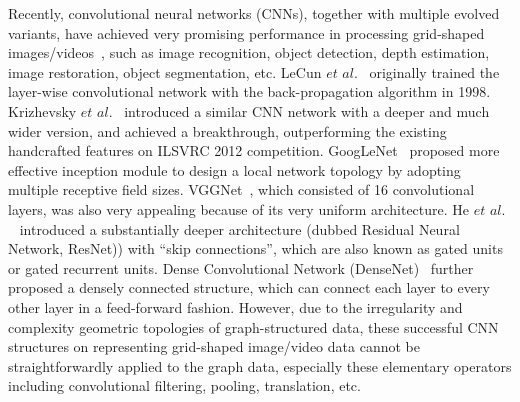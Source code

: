 \documentclass[journal]{IEEEtran}
\begin{document}
Recently, convolutional neural networks (CNNs), together with multiple evolved variants, have achieved very promising performance in processing grid-shaped images/videos~\cite{alexnet,vgg,densenet,resnet}, such as image recognition, object detection, depth estimation, image restoration, object segmentation, etc.
LeCun $\textit{et al.}$~\cite{Lecun98} originally trained the layer-wise convolutional network with the back-propagation algorithm in 1998.
Krizhevsky $\textit{et al.}$~\cite{alexnet} introduced a similar CNN network with a deeper and much wider version, and achieved a breakthrough, outperforming the existing handcrafted features on ILSVRC 2012 competition.
GoogLeNet~\cite{googleLeNet} proposed more effective inception module to design a local network topology by adopting multiple receptive field sizes.
VGGNet~\cite{vgg}, which consisted of 16 convolutional layers, was also very appealing because of its very uniform architecture.
He $\textit{et al.}$~\cite{resnet} introduced a substantially deeper architecture (dubbed Residual Neural Network, ResNet)) with “skip connections”, which are also known as gated units or gated recurrent units.
Dense Convolutional Network (DenseNet)~\cite{densenet} further proposed a densely connected structure, which can connect each layer to every other layer in a feed-forward fashion.
However, due to the irregularity and complexity geometric topologies of graph-structured data, these successful CNN structures on representing grid-shaped image/video data cannot be straightforwardly applied to the graph data, especially these elementary operators including convolutional filtering, pooling, translation, etc.
\end{document}
